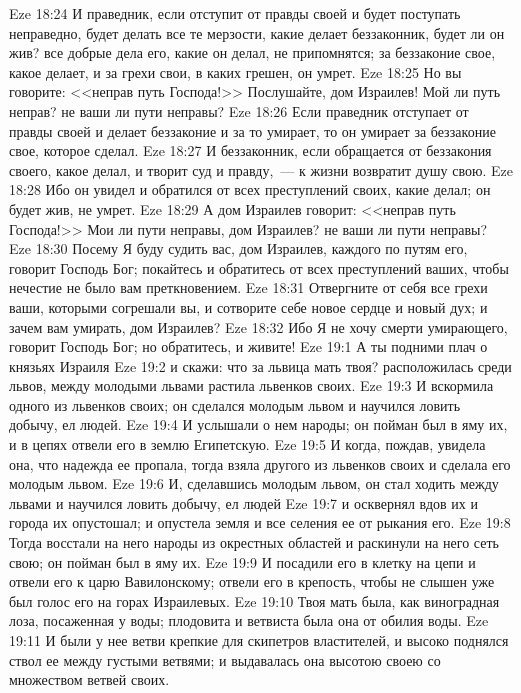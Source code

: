 \vs Eze 18:24 И праведник, если отступит от правды своей и будет поступать неправедно, будет делать все те мерзости, какие делает беззаконник, будет ли он жив? все добрые дела его, какие он делал, не припомнятся; за беззаконие свое, какое делает, и за грехи свои, в каких грешен, он умрет.
\vs Eze 18:25 Но вы говорите: <<неправ путь Господа!>> Послушайте, дом Израилев! Мой ли путь неправ? не ваши ли пути неправы?
\vs Eze 18:26 Если праведник отступает от правды своей и делает беззаконие и за то умирает, то он умирает за беззаконие свое, которое сделал.
\vs Eze 18:27 И беззаконник, если обращается от беззакония своего, какое делал, и творит суд и правду,~--- к жизни возвратит душу свою.
\vs Eze 18:28 Ибо он увидел и обратился от всех преступлений своих, какие делал; он будет жив, не умрет.
\vs Eze 18:29 А дом Израилев говорит: <<неправ путь Господа!>> Мои ли пути неправы, дом Израилев? не ваши ли пути неправы?
\vs Eze 18:30 Посему Я буду судить вас, дом Израилев, каждого по путям его, говорит Господь Бог; покайтесь и обратитесь от всех преступлений ваших, чтобы нечестие не было вам преткновением.
\vs Eze 18:31 Отвергните от себя все грехи ваши, которыми согрешали вы, и сотворите себе новое сердце и новый дух; и зачем вам умирать, дом Израилев?
\vs Eze 18:32 Ибо Я не хочу смерти умирающего, говорит Господь Бог; но обратитесь, и живите!
\vs Eze 19:1 А ты подними плач о князьях Израиля
\vs Eze 19:2 и скажи: что за львица мать твоя? расположилась среди львов, между молодыми львами растила львенков своих.
\vs Eze 19:3 И вскормила одного из львенков своих; он сделался молодым львом и научился ловить добычу, ел людей.
\vs Eze 19:4 И услышали о нем народы; он пойман был в яму их, и в цепях отвели его в землю Египетскую.
\vs Eze 19:5 И когда, пождав, увидела она, что надежда ее пропала, тогда взяла другого из львенков своих и сделала его молодым львом.
\vs Eze 19:6 И, сделавшись молодым львом, он стал ходить между львами и научился ловить добычу, ел людей
\vs Eze 19:7 и осквернял вдов их и города их опустошал; и опустела земля и все селения ее от рыкания его.
\vs Eze 19:8 Тогда восстали на него народы из окрестных областей и раскинули на него сеть свою; он пойман был в яму их.
\vs Eze 19:9 И посадили его в клетку на цепи и отвели его к царю Вавилонскому; отвели его в крепость, чтобы не слышен уже был голос его на горах Израилевых.
\vs Eze 19:10 Твоя мать была, как виноградная лоза, посаженная у воды; плодовита и ветвиста была она от обилия воды.
\vs Eze 19:11 И были у нее ветви крепкие для скипетров властителей, и высоко поднялся ствол ее между густыми ветвями; и выдавалась она высотою своею со множеством ветвей своих.
